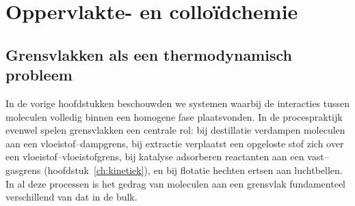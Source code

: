 %
\chapter{Oppervlakte- en collo\"idchemie}
\label{ch:oppervlakte}

\section{Grensvlakken als een thermodynamisch probleem}

In de vorige hoofdstukken beschouwden we systemen waarbij de interacties tussen moleculen volledig binnen een homogene fase plaatsvonden. In de procespraktijk evenwel spelen grensvlakken een centrale rol: bij destillatie verdampen moleculen aan een vloeistof--dampgrens, bij extractie verplaatst een opgeloste stof zich over een vloeistof--vloeistofgrens, bij katalyse adsorberen reactanten aan een vast--gasgrens (hoofdstuk~\ref{ch:kinetiek}), en bij flotatie hechten ertsen aan luchtbellen. In al deze processen is het gedrag van moleculen aan een grensvlak fundamenteel verschillend van dat in de bulk.

